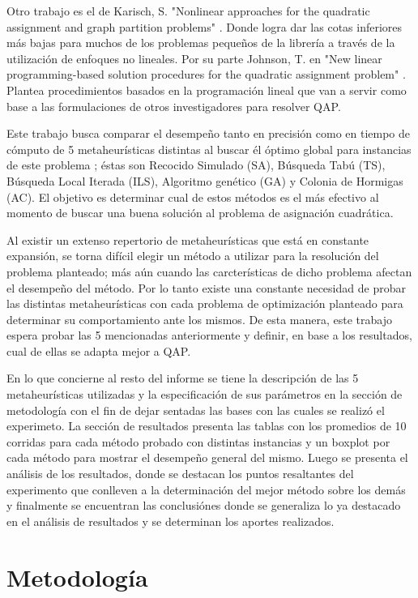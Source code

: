 \documentclass{ci5652}
\begin{document}
Otro trabajo es el de Karisch, S. "Nonlinear approaches for the quadratic assignment and graph partition problems" \cite{11}. Donde logra dar las cotas inferiores más bajas para muchos de los problemas pequeños de la librería a través de la utilización de enfoques no lineales. Por su parte Johnson, T. en "New linear programming-based solution procedures for the quadratic assignment problem" \cite{13}. Plantea procedimientos basados en la programación lineal que van a servir como base a las formulaciones de otros investigadores para resolver QAP.

Este trabajo busca comparar el desempeño tanto en precisión como en tiempo de cómputo de 5 metaheurísticas distintas al buscar él óptimo global para instancias de este problema ; éstas son Recocido Simulado (SA), Búsqueda Tabú (TS), Búsqueda Local Iterada (ILS), Algoritmo genético (GA) y Colonia de Hormigas (AC). El objetivo es determinar cual de estos métodos es el más efectivo al momento de buscar una buena solución al problema de asignación cuadrática.

Al existir un extenso repertorio de metaheurísticas que está en constante expansión, se torna difícil elegir un método a utilizar para la resolución del problema planteado; más aún cuando las carcterísticas de dicho problema afectan el desempeño del método. Por lo tanto existe una constante necesidad de probar las distintas metaheurísticas con cada problema de optimización planteado para determinar su comportamiento ante los mismos. De esta manera, este trabajo espera probar las 5 mencionadas anteriormente y definir, en base a los resultados, cual de ellas se adapta mejor a QAP.

En lo que concierne al resto del informe se tiene la descripción de las 5 metaheurísticas utilizadas y la especificación de sus parámetros en la sección de metodología con el fin de dejar sentadas las bases con las cuales se realizó el experimeto. La sección de resultados presenta las tablas con los promedios de 10 corridas para cada método probado con distintas instancias y un boxplot por cada método para mostrar el desempeño general del mismo. Luego se presenta el análisis de los resultados, donde  se destacan los puntos resaltantes del experimento que conlleven a la determinación del mejor método sobre los demás y finalmente se encuentran las conclusiónes donde se generaliza lo ya destacado en el análisis de resultados y se determinan los aportes realizados.

\section{Metodología}
\end{document}
